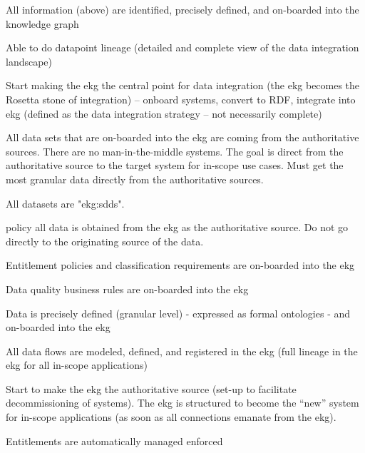 \begin{scoring}

    \item All information (above) are identified, precisely defined, and on-boarded into the knowledge graph
    \item Able to do datapoint lineage (detailed and complete view of the data integration landscape)
    \item Start making the \gls{ekg} the central point for data integration (the \gls{ekg} becomes the Rosetta stone of
          integration) -- onboard systems, convert to RDF, integrate into \gls{ekg} (defined as the
          data integration strategy -- not necessarily complete)
    \item All data sets that are on-boarded into the \gls{ekg} are coming from the authoritative sources.
          There are no man-in-the-middle systems.
          The goal is direct from the authoritative source to the target system for in-scope use cases.
          Must get the most granular data directly from the authoritative sources.
    \item All datasets are "\glspl{ekg:sdd}".
    \item [policy] all data is obtained from the \gls{ekg} as the authoritative source.
          Do not go directly to the originating source of the data.
    \item Entitlement policies and classification requirements are on-boarded into the \gls{ekg}
    \item Data quality business rules are on-boarded into the \gls{ekg}

\end{scoring}

\kgmmscoringlevelThree

\begin{scoring}

    \item Data is precisely defined (granular level) - expressed as formal ontologies - and on-boarded into the \gls{ekg}
    \item All data flows are modeled, defined, and registered in the \gls{ekg} (full lineage in the \gls{ekg} for all
          in-scope applications)
    \item Start to make the \gls{ekg} the authoritative source (set-up to facilitate decommissioning of systems).
          The \gls{ekg} is structured to become the “new” system for in-scope applications (as soon as all
          connections emanate from the \gls{ekg}).
    \item Entitlements are automatically managed enforced

\end{scoring}

